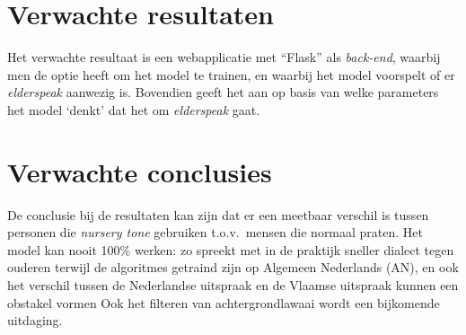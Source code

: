\section{Verwachte resultaten}
\label{sec:verwachte_resultaten}

Het verwachte resultaat is een webapplicatie met ``Flask'' als \textit{back-end}, waarbij men de optie heeft om het model te trainen, en waarbij het model voorspelt of er \textit{elderspeak} aanwezig is. Bovendien geeft het aan op basis van welke parameters het model `denkt' dat het om \textit{elderspeak} gaat.


\section{Verwachte conclusies}
\label{sec:verwachte_conclusies}

De conclusie bij de resultaten kan zijn dat er een meetbaar verschil is tussen personen die \textit{nursery tone} gebruiken t.o.v.\ mensen die normaal praten.
Het model kan nooit 100\% werken: zo spreekt met in de praktijk sneller dialect tegen ouderen terwijl de algoritmes getraind zijn op Algemeen Nederlands (AN), en ook het verschil tussen de Nederlandse uitspraak en de Vlaamse uitspraak kunnen een obstakel vormen
Ook het filteren van achtergrondlawaai wordt een bijkomende uitdaging.

